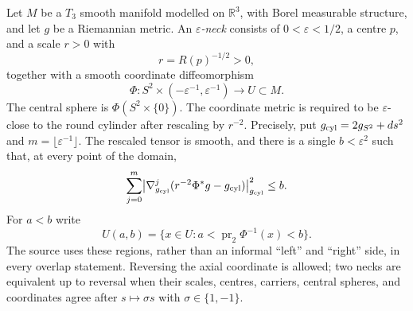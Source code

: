 \begin{definition}
\label{def:neck-cap-neck}
Let $M$ be a $T_3$ smooth manifold modelled on $\mathbb R^3$, with Borel
measurable structure, and let $g$ be a Riemannian metric.  An
\emph{$\varepsilon$-neck} consists of $0<\varepsilon<1/2$, a centre $p$,
and a scale $r>0$ with
\[
  r=R(p)^{-1/2}>0,
\]
together with a smooth coordinate diffeomorphism
\[
 \Phi:S^2\times(-\varepsilon^{-1},\varepsilon^{-1})\longrightarrow U\subset M.
\]
The central sphere is $\Phi(S^2\times\{0\})$.  The coordinate metric is
required to be $\varepsilon$-close to the round cylinder after rescaling by
$r^{-2}$.  Precisely, put $g_{\rm cyl}=2g_{S^2}+ds^2$ and
$m=\lfloor\varepsilon^{-1}\rfloor$.  The rescaled tensor is smooth, and
there is a single $b<\varepsilon^2$ such that, at every point of the domain,
\[
 \sum_{j=0}^{m}\bigl|\nabla_{g_{\rm cyl}}^j
       (r^{-2}\Phi^*g-g_{\rm cyl})\bigr|_{g_{\rm cyl}}^2\le b.
\]
For $a<b$ write
\[
 U(a,b)=\{x\in U:a<\operatorname{pr}_2\Phi^{-1}(x)<b\}.
\]
The source uses these regions, rather than an informal ``left'' and ``right''
side, in every overlap statement.  Reversing the axial coordinate is allowed;
two necks are equivalent up to reversal when their scales, centres, carriers,
central spheres, and coordinates agree after $s\mapsto\sigma s$ with
$\sigma\in\{1,-1\}$.
\end{definition}

